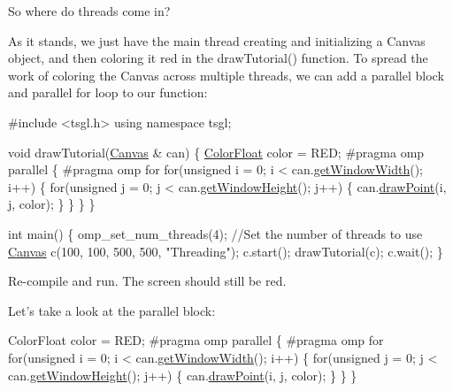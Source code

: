 So where do threads come in?

As it stands, we just have the main thread creating and initializing a Canvas object, and then coloring it red in the {\ttfamily draw\-Tutorial()} function. To spread the work of coloring the Canvas across multiple threads, we can add a parallel block and parallel {\ttfamily for} loop to our function\-:


\begin{DoxyCode}
\textcolor{preprocessor}{#include <tsgl.h>}
\textcolor{keyword}{using namespace }tsgl;

\textcolor{keywordtype}{void} drawTutorial(\hyperlink{classtsgl_1_1_canvas}{Canvas} & can) \{
   \hyperlink{structtsgl_1_1_color_float}{ColorFloat} color = RED;
\textcolor{preprocessor}{   #pragma omp parallel}
\textcolor{preprocessor}{}   \{
\textcolor{preprocessor}{     #pragma omp for}
\textcolor{preprocessor}{}     \textcolor{keywordflow}{for}(\textcolor{keywordtype}{unsigned} i = 0; i < can.\hyperlink{classtsgl_1_1_canvas_a086a0322f4a6ab27da6929b1aa0593af}{getWindowWidth}(); i++) \{
        \textcolor{keywordflow}{for}(\textcolor{keywordtype}{unsigned} j = 0; j < can.\hyperlink{classtsgl_1_1_canvas_ad740ebe5d6bd69ab79cde3e84f369f35}{getWindowHeight}(); j++) \{
           can.\hyperlink{classtsgl_1_1_canvas_a6c17c90cd13f7b0184a25e4acc2b7426}{drawPoint}(i, j, color);
        \}
     \}
   \}
\}

\textcolor{keywordtype}{int} main() \{
  omp\_set\_num\_threads(4);  \textcolor{comment}{//Set the number of threads to use}
  \hyperlink{classtsgl_1_1_canvas}{Canvas} c(100, 100, 500, 500, \textcolor{stringliteral}{"Threading"});
  c.start();
  drawTutorial(c);
  c.wait();
\}
\end{DoxyCode}


Re-\/compile and run. The screen should still be red.

Let's take a look at the parallel block\-:


\begin{DoxyCode}
ColorFloat color = RED;
\textcolor{preprocessor}{#pragma omp parallel}
\textcolor{preprocessor}{}\{
\textcolor{preprocessor}{  #pragma omp for}
\textcolor{preprocessor}{}  \textcolor{keywordflow}{for}(\textcolor{keywordtype}{unsigned} i = 0; i < can.\hyperlink{classtsgl_1_1_canvas_a086a0322f4a6ab27da6929b1aa0593af}{getWindowWidth}(); i++) \{
     \textcolor{keywordflow}{for}(\textcolor{keywordtype}{unsigned} j = 0; j < can.\hyperlink{classtsgl_1_1_canvas_ad740ebe5d6bd69ab79cde3e84f369f35}{getWindowHeight}(); j++) \{
        can.\hyperlink{classtsgl_1_1_canvas_a6c17c90cd13f7b0184a25e4acc2b7426}{drawPoint}(i, j, color);
     \}
  \}
\}
\end{DoxyCode}


